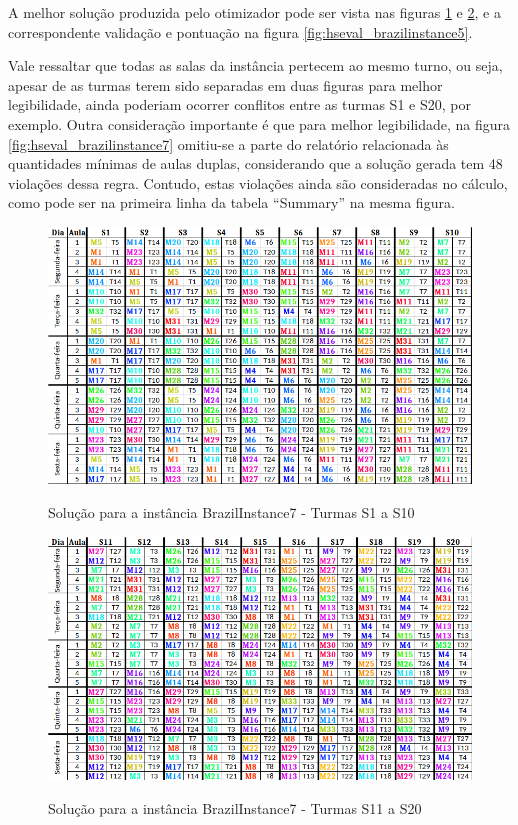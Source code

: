 \newpage
A melhor solução produzida pelo otimizador pode ser vista nas figuras \ref{fig:brazilinstance7_solucao} e \ref{fig:brazilinstance7_solucao_2}, e a correspondente validação e pontuação na figura \ref{fig:hseval_brazilinstance5}.

Vale ressaltar que todas as salas da instância pertecem ao mesmo turno, ou seja, apesar de as turmas terem sido separadas em duas figuras para melhor legibilidade, ainda poderiam ocorrer conflitos entre as turmas S1 e S20, por exemplo. Outra consideração importante é que para melhor legibilidade, na figura \ref{fig:hseval_brazilinstance7} omitiu-se a parte do relatório relacionada às quantidades mínimas de aulas duplas, considerando que a solução gerada tem 48 violações dessa regra. Contudo, estas violações ainda são consideradas no cálculo, como pode ser na primeira linha da tabela ``Summary'' na mesma figura.

\begin{figure}[h]
	\centering
	\caption{Solução para a instância BrazilInstance7 - Turmas S1 a S10}
	\includegraphics[width=1\textwidth]{./dados/figuras/brazilinstance7}
	\label{fig:brazilinstance7_solucao}
\end{figure}

\begin{figure}[h]
	\centering
	\caption{Solução para a instância BrazilInstance7 - Turmas S11 a S20}
	\includegraphics[width=1\textwidth]{./dados/figuras/brazilinstance7_2}
	\label{fig:brazilinstance7_solucao_2}
\end{figure}

